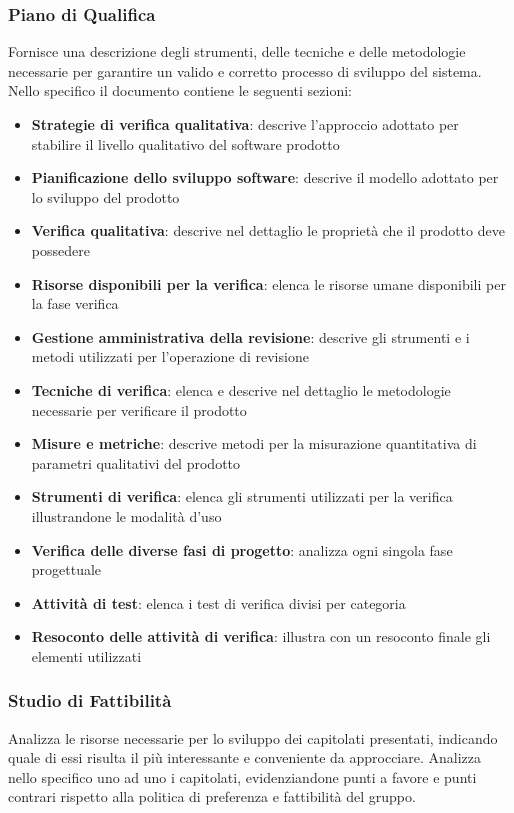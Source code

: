 \documentclass[a4paper,11pt]{article}
\begin{document}
\subsubsection{Piano di Qualifica}
Fornisce una descrizione degli strumenti, delle tecniche e delle metodologie necessarie per garantire un valido e corretto processo di sviluppo del sistema. Nello specifico il documento contiene le seguenti sezioni:
\begin{itemize}
\item \textbf{Strategie di verifica qualitativa}: descrive l'approccio adottato per stabilire il livello qualitativo del software prodotto
\item \textbf{Pianificazione dello sviluppo software}: descrive il modello adottato per lo sviluppo del prodotto
\item \textbf{Verifica qualitativa}: descrive nel dettaglio le propriet\`a che il prodotto deve possedere
\item \textbf{Risorse disponibili per la verifica}: elenca le risorse umane disponibili per la fase verifica
\item \textbf{Gestione amministrativa della revisione}: descrive gli strumenti e i metodi utilizzati per l'operazione di revisione
\item \textbf{Tecniche di verifica}: elenca e descrive nel dettaglio le metodologie necessarie per verificare il prodotto
\item \textbf{Misure e metriche}: descrive metodi per la misurazione quantitativa di parametri qualitativi del prodotto
\item \textbf{Strumenti di verifica}: elenca gli strumenti utilizzati per la verifica illustrandone le modalit\`a d'uso
\item \textbf{Verifica delle diverse fasi di progetto}: analizza ogni singola fase progettuale
\item \textbf{Attivit\`a di test}: elenca i test di verifica divisi per categoria
\item \textbf{Resoconto delle attivit\`a di verifica}: illustra con un resoconto finale gli elementi utilizzati 
\end{itemize} 
\subsubsection{Studio di Fattibilit\`a}
Analizza le risorse necessarie per lo sviluppo dei capitolati presentati, indicando quale di essi risulta il pi\`u interessante e conveniente da approcciare. Analizza nello specifico uno ad uno i capitolati, evidenziandone punti a favore e punti contrari rispetto alla politica di preferenza e fattibilit\`a del gruppo.
\end{document}
